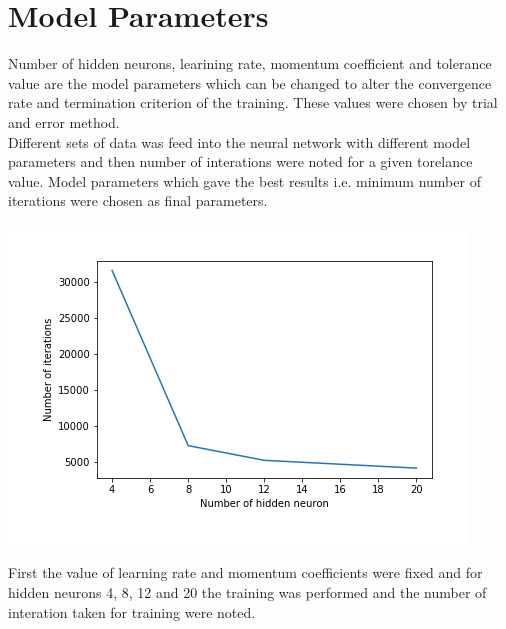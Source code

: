 \section{Model Parameters}
Number of hidden neurons, learining rate, momentum coefficient and tolerance value are the model parameters which can be changed to alter the convergence rate and termination criterion of the training. These values were chosen by trial and error method.\\
Different sets of data was feed into the neural network with different model parameters and then number of interations were noted for a given torelance value. Model parameters which gave the best results i.e. minimum number of iterations were chosen as final parameters.\\
\begin{center}
	\includegraphics[scale=0.8]{images/iterations/Plot_01.png}
\end{center}
First the value of learning rate and momentum coefficients were fixed and for hidden neurons 4, 8, 12 and 20 the training was performed and the number of interation taken for training were noted.\\
